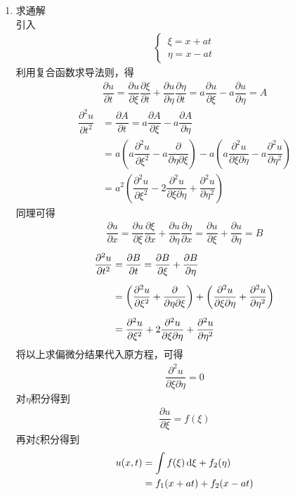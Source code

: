 \begin{enumerate}[\textbf{步骤}1 ]
	\item 求通解\\
	引入
	\begin{align}
		\begin{cases}
			\, \xi = x + at\\
			\, \eta = x - at
		\end{cases}
	\end{align}
	利用复合函数求导法则，得
	\begin{align*}
		\dfrac{\partial u}{\partial t} = \dfrac{\partial u}{\partial \xi}\dfrac{\partial \xi}{\partial t} + \dfrac{\partial u}{\partial \eta} \dfrac{\partial \eta}{\partial t} = a \dfrac{\partial u}{\partial \xi} - a \dfrac{\partial u}{\partial \eta} = A
	\end{align*}
	\begin{align*}
		\dfrac{\partial^2 u}{\partial t^2} &= \dfrac{\partial A}{\partial t} = a \dfrac{\partial A}{\partial \xi} - a \dfrac{\partial A}{\partial \eta} \\[0.5em]
		&= a\left(a \dfrac{\partial^2 u}{\partial \xi^2} - a \dfrac{\partial }{\partial \eta \partial \xi}\right) - a \left(a \dfrac{\partial^2 u}{\partial \xi \partial  \eta} - a \dfrac{\partial^2 u}{\partial \eta^2}\right)\\[0.5em]
		& = a^2 \left(\dfrac{\partial^2 u}{\partial \xi^2} - 2\dfrac{\partial^2 u}{\partial \xi \partial \eta} + \dfrac{\partial^2 u}{\partial \eta^2}\right)
	\end{align*}
	同理可得
	\begin{align*}
		\dfrac{\partial u}{\partial x} = \dfrac{\partial u}{\partial \xi}\dfrac{\partial \xi}{\partial x} + \dfrac{\partial u}{\partial \eta} \dfrac{\partial \eta}{\partial x} = \dfrac{\partial u}{\partial \xi} + \dfrac{\partial u}{\partial \eta} = B
	\end{align*}
	\begin{align}
		\dfrac{\partial^2 u}{\partial t^2} &= \dfrac{\partial B}{\partial t} = \dfrac{\partial B}{\partial \xi} + \dfrac{\partial B}{\partial \eta} \notag\\[0.5em]
		&= \left(\dfrac{\partial^2 u}{\partial \xi^2} +\dfrac{\partial }{\partial \eta \partial \xi}\right) + \left(\dfrac{\partial^2 u}{\partial \xi \partial  \eta} + \dfrac{\partial^2 u}{\partial \eta^2}\right) \notag\\[0.5em]
		& = \dfrac{\partial^2 u}{\partial \xi^2} + 2\dfrac{\partial^2 u}{\partial \xi \partial \eta} + \dfrac{\partial^2 u}{\partial \eta^2}
	\end{align}
	将以上求偏微分结果代入原方程，可得
	\begin{align}
		\dfrac{\partial^2 u}{\partial \xi \partial \eta} = 0
	\end{align}
	对$\eta$积分得到
	\begin{align*}
		\dfrac{\partial u}{\partial \xi} = f(\xi)
	\end{align*}
	再对$\xi$积分得到
	\begin{align}
		u(x, t) &= \int f(\xi) \, {\rm{d}} \xi + f_2(\eta)\notag \\
		& = f_1(x+at) + f_2(x-at)
	\end{align}


\end{enumerate}
